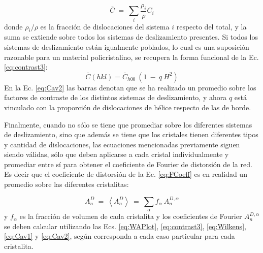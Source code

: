 \begin{equation}
  \bar{C} \ = \ \sum_i \frac{\rho_i}{\rho} C_i
  \label{eq:Cav1}
\end{equation}
\noindent
donde $\rho_i/\rho$ es la fracción de dislocaciones del sistema $i$ respecto del total, y la suma se extiende sobre todos los sistemas de deslizamiento presentes.
Si todos los sistemas de deslizamiento están igualmente poblados, lo cual es una suposición razonable para un material policristalino, se recupera la forma funcional de la Ec. \ref{eq:contrast3}:
\begin{equation}
  \bar{C}(hkl) = \bar{C}_{h00}\ (1 \ - \ q\ H^2)
  \label{eq:Cav2}
\end{equation}
\noindent
En la Ec. \ref{eq:Cav2} las barras denotan que se ha realizado un promedio sobre los factores de contraste de los distintos sistemas de deslizamiento, y ahora $q$ está vinculado con la proporción de dislocaciones de hélice respecto de las de borde.

Finalmente, cuando no sólo se tiene que promediar sobre los diferentes sistemas de deslizamiento, sino que además se tiene que los cristales tienen diferentes tipos y cantidad de dislocaciones, las ecuaciones mencionadas previamente siguen siendo válidas, sólo que deben aplicarse a cada cristal individualmente y promediar entre sí para obtener el coeficiente de Fourier de distorsión de la red. Es decir que el coeficiente de distorsión de la Ec. \ref{eq:FCoeff} es en realidad un promedio sobre las diferentes cristalitas:

\begin{equation}
  A_n^D \ = \ \left< A_n^D \right> \ = \ \sum_{\alpha} f_{\alpha} \ A_{n}^{D,\alpha}
  \label{eq:FCoeffAv}
\end{equation}
\noindent
y $f_{\alpha}$ es la fracción de volumen de cada cristalita y los coeficientes de Fourier $A_{n}^{D,\alpha}$ se deben calcular utilizando las Ecs. \ref{eq:WAPlot}, \ref{eq:contrast3}, \ref{eq:Wilkens}, \ref{eq:Cav1} y \ref{eq:Cav2}, según corresponda a cada caso particular para cada cristalita.

